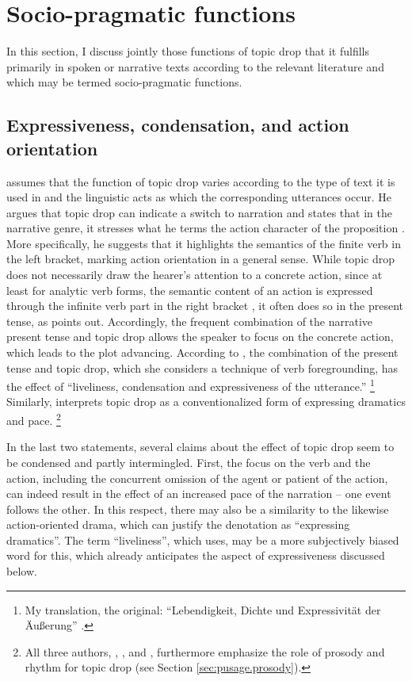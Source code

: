 \section{Socio-pragmatic functions}\label{sec:pusage.effects}
In this section, I discuss jointly those functions of topic drop that it fulfills primarily in spoken or narrative texts according to the relevant literature and which may be termed socio-pragmatic functions.

\subsection{Expressiveness, condensation, and action orientation}\label{sec:pusage.expressiv}
\citet{auer1993} assumes that the function of topic drop varies according to the type of text it is used in and the linguistic acts as which the corresponding utterances occur.
He argues that topic drop can indicate a switch to narration and states that in the narrative genre, it stresses what he terms the action character of the proposition \citep[219]{auer1993}.
More specifically, he suggests that it highlights the semantics of the finite verb in the left bracket, marking action orientation in a general sense.
While topic drop does not necessarily draw the hearer's attention to a concrete action, since at least for analytic verb forms, the semantic content of an action is expressed through the infinite verb part in the right bracket \citep[218]{auer1993}, it often does so in the present tense, as  \citet[101]{guenthner2006} points out.
Accordingly, the frequent combination of the narrative present tense and topic drop allows the speaker to focus on the concrete action, which leads to the plot advancing.
According to \citet[104]{guenthner2006}, the combination of the present tense and topic drop, which she considers a technique of verb foregrounding, has the effect of ``liveliness, condensation and expressiveness of the utterance.''%
\footnote{My translation, the original: ``Lebendigkeit, Dichte und Expressivität der Äußerung''  \citep[104]{guenthner2006}.}
%
Similarly, \citet[302]{sandig2000} interprets topic drop as a conventionalized form of expressing dramatics and pace.%
\footnote{All three authors, \citet{auer1993}, \citet{sandig2000}, and \citet{guenthner2006}, furthermore emphasize the role of prosody  and rhythm for topic drop (see Section \ref{sec:pusage.prosody}).}
%

In the last two statements, several claims about the effect of topic drop seem to be condensed and partly intermingled.
First, the focus on the verb and the action, including the concurrent omission of the agent or patient of the action, can indeed result in the effect of an increased pace of the narration -- one event follows the other.
In this respect, there may also be a similarity to the likewise action-oriented drama, which can justify the denotation as ``expressing dramatics''.
The term ``liveliness'', which \citet[104]{guenthner2006} uses, may be a more subjectively biased word for this, which already anticipates the aspect of expressiveness discussed below.

